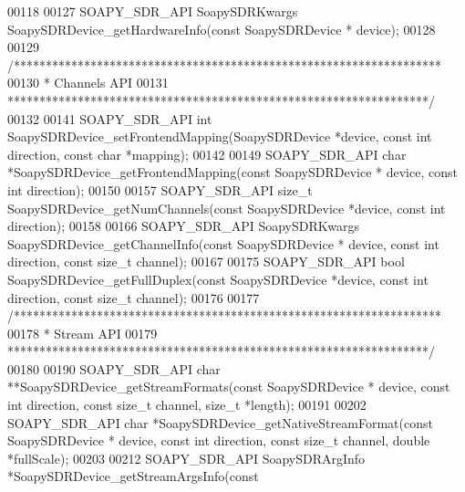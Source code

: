 \begin{DoxyCode}
00118 
00127 SOAPY_SDR_API SoapySDRKwargs SoapySDRDevice_getHardwareInfo(\textcolor{keyword}{const} SoapySDRDevice *
      device);
00128 
00129 \textcolor{comment}{/*******************************************************************}
00130 \textcolor{comment}{ * Channels API}
00131 \textcolor{comment}{ ******************************************************************/}
00132 
00141 SOAPY_SDR_API \textcolor{keywordtype}{int} SoapySDRDevice_setFrontendMapping(SoapySDRDevice *device, \textcolor{keyword}{const} \textcolor{keywordtype}{int} direction, \textcolor{keyword}{const} \textcolor{keywordtype}{char}
       *mapping);
00142 
00149 SOAPY_SDR_API \textcolor{keywordtype}{char} *SoapySDRDevice_getFrontendMapping(\textcolor{keyword}{const} SoapySDRDevice *
      device, \textcolor{keyword}{const} \textcolor{keywordtype}{int} direction);
00150 
00157 SOAPY_SDR_API \textcolor{keywordtype}{size\_t} SoapySDRDevice_getNumChannels(\textcolor{keyword}{const} SoapySDRDevice *device, \textcolor{keyword}{const} \textcolor{keywordtype}{int} direction);
00158 
00166 SOAPY_SDR_API SoapySDRKwargs SoapySDRDevice_getChannelInfo(\textcolor{keyword}{const} SoapySDRDevice *
      device, \textcolor{keyword}{const} \textcolor{keywordtype}{int} direction, \textcolor{keyword}{const} \textcolor{keywordtype}{size\_t} channel);
00167 
00175 SOAPY_SDR_API \textcolor{keywordtype}{bool} SoapySDRDevice_getFullDuplex(\textcolor{keyword}{const} SoapySDRDevice *device, \textcolor{keyword}{const} \textcolor{keywordtype}{int} direction, \textcolor{keyword}{const} \textcolor{keywordtype}{
      size\_t} channel);
00176 
00177 \textcolor{comment}{/*******************************************************************}
00178 \textcolor{comment}{ * Stream API}
00179 \textcolor{comment}{ ******************************************************************/}
00180 
00190 SOAPY_SDR_API \textcolor{keywordtype}{char} **SoapySDRDevice_getStreamFormats(\textcolor{keyword}{const} SoapySDRDevice *
      device, \textcolor{keyword}{const} \textcolor{keywordtype}{int} direction, \textcolor{keyword}{const} \textcolor{keywordtype}{size\_t} channel, \textcolor{keywordtype}{size\_t} *length);
00191 
00202 SOAPY_SDR_API \textcolor{keywordtype}{char} *SoapySDRDevice_getNativeStreamFormat(\textcolor{keyword}{const} SoapySDRDevice *
      device, \textcolor{keyword}{const} \textcolor{keywordtype}{int} direction, \textcolor{keyword}{const} \textcolor{keywordtype}{size\_t} channel, \textcolor{keywordtype}{double} *fullScale);
00203 
00212 SOAPY_SDR_API SoapySDRArgInfo *SoapySDRDevice_getStreamArgsInfo(\textcolor{keyword}{const} 

\end{DoxyCode}
